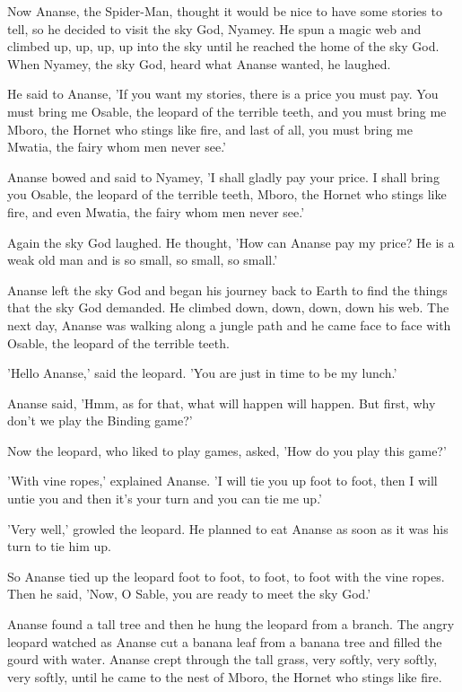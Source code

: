 Now Ananse, the Spider-Man, thought it would be nice to have some stories to tell, so he decided to visit the sky God, Nyamey. He spun a magic web and climbed up, up, up, up into the sky until he reached the home of the sky God. When Nyamey, the sky God, heard what Ananse wanted, he laughed.

He said to Ananse, 'If you want my stories, there is a price you must pay. You must bring me Osable, the leopard of the terrible teeth, and you must bring me Mboro, the Hornet who stings like fire, and last of all, you must bring me Mwatia, the fairy whom men never see.'

Ananse bowed and said to Nyamey, 'I shall gladly pay your price. I shall bring you Osable, the leopard of the terrible teeth, Mboro, the Hornet who stings like fire, and even Mwatia, the fairy whom men never see.'

Again the sky God laughed. He thought, 'How can Ananse pay my price? He is a weak old man and is so small, so small, so small.'

Ananse left the sky God and began his journey back to Earth to find the things that the sky God demanded. He climbed down, down, down, down his web. The next day, Ananse was walking along a jungle path and he came face to face with Osable, the leopard of the terrible teeth.

'Hello Ananse,' said the leopard. 'You are just in time to be my lunch.'

Ananse said, 'Hmm, as for that, what will happen will happen. But first, why don't we play the Binding game?'

Now the leopard, who liked to play games, asked, 'How do you play this game?'

'With vine ropes,' explained Ananse. 'I will tie you up foot to foot, then I will untie you and then it's your turn and you can tie me up.'

'Very well,' growled the leopard. He planned to eat Ananse as soon as it was his turn to tie him up.

So Ananse tied up the leopard foot to foot, to foot, to foot with the vine ropes. Then he said, 'Now, O Sable, you are ready to meet the sky God.'

Ananse found a tall tree and then he hung the leopard from a branch. The angry leopard watched as Ananse cut a banana leaf from a banana tree and filled the gourd with water. Ananse crept through the tall grass, very softly, very softly, very softly, until he came to the nest of Mboro, the Hornet who stings like fire.

